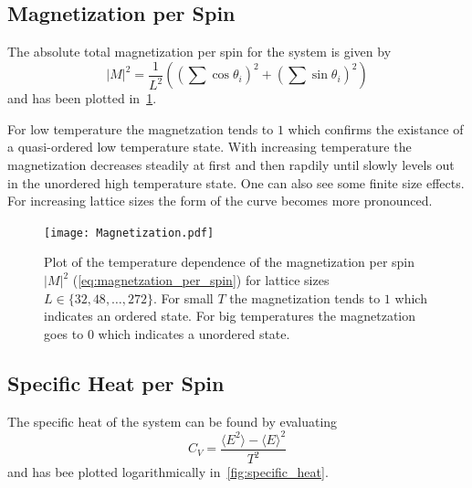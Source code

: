\subsection{Magnetization per Spin}
The absolute total magnetization per spin for the system is given by
\begin{equation}\label{eq:magnetzation_per_spin}
	{\lvert M \rvert}^2 = \frac{1}{L^2} \left( \left( \sum{\cos{\theta_i}} \right)^2 + \left( \sum{\sin{\theta_i}} \right)^2 \right)
\end{equation}
and has been plotted in~\cref{fig:magnetization_per_spin}.

For low temperature the magnetzation tends to $\num{1}$ which confirms the existance of a quasi-ordered low temperature state. With increasing temperature the magnetization decreases steadily at first and then rapdily until slowly levels out in the unordered high temperature state. One can also see  some finite size effects. For increasing lattice sizes the form of the curve becomes more pronounced.
\begin{figure}[!htb]
	\centering
	\texttt{[image: Magnetization.pdf]}
	\caption[Temperature dependence of the magnetzation per spin ${\lvert M \rvert}^2$]{Plot of the temperature dependence of the magnetization per spin ${\lvert M \rvert}^2$ (\cref{eq:magnetzation_per_spin}) for lattice sizes $L\in\{32, 48, \dots, 272\}$. For small $T$ the magnetization tends to $1$ which indicates an ordered state. For big temperatures the magnetzation goes to $0$ which indicates a unordered state.}
	\label{fig:magnetization_per_spin}
\end{figure}

\subsection{Specific Heat per Spin}\label{sec:specific_heat_per_spin}
The specific heat of the system can be found by evaluating
\begin{equation}\label{eq:specific_heat_per_spin}
	C_V = \frac{\langle E^2 \rangle - {\langle E \rangle}^2}{T^2}
\end{equation}
and has bee plotted logarithmically in~\cref{fig:specific_heat}.

